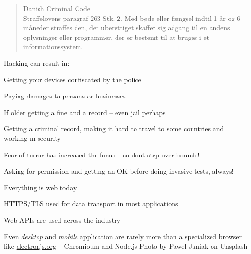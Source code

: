 \documentclass[Screen16to9,17pt]{foils}
\begin{document}

\begin{quote}\small
Danish Criminal Code\\
Straffelovens paragraf 263 Stk. 2. Med bøde eller fængsel indtil 1 år og 6 måneder straffes den, der uberettiget skaffer sig adgang til en andens oplysninger eller programmer, der er bestemt til at bruges i et informationssystem.
\end{quote}

Hacking can result in:
\begin{list2}
\item Getting your devices confiscated by the police
\item Paying damages to persons or businesses
\item If older getting a fine and a record -- even jail perhaps
\item Getting a criminal record, making it hard to travel to some countries and working in security
\item Fear of terror has increased the focus -- so dont step over bounds!
\end{list2}

Asking for permission and getting an OK before doing invasive tests, always!




\begin{list2}
\item Everything is web today
\item HTTPS/TLS used for data transport in most applications
\item Web APIs are used across the industry
\item Even \emph{desktop} and \emph{mobile} application are rarely more than a specialized browser\\ like \url{electronjs.org} -- Chromioum and Node.js
\hfill {\footnotesize Photo by Pawel Janiak on Unsplash}
\end{list2}


\end{document}
